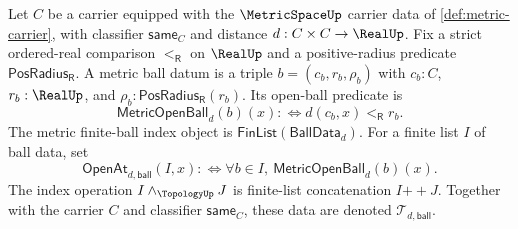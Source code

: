 \begin{definition}
\label{def:metric-finite-ball-indexed-topology}
Let $C$ be a carrier equipped with the $\MetricSpaceUp$ carrier data of \autoref{def:metric-carrier}, with classifier $\mathsf{same}_C$ and distance $d:C\times C\to\RealUp$. Fix a strict ordered-real comparison $<_{\mathsf R}$ on $\RealUp$ and a positive-radius predicate $\mathsf{PosRadius}_{\mathsf R}$. A metric ball datum is a triple $b=(c_b,r_b,\rho_b)$ with $c_b:C$, $r_b:\RealUp$, and $\rho_b:\mathsf{PosRadius}_{\mathsf R}(r_b)$. Its open-ball predicate is
$$
\mathsf{MetricOpenBall}_d(b)(x)
:\Longleftrightarrow
 d(c_b,x)<_{\mathsf R}r_b.
$$
The metric finite-ball index object is $\mathsf{FinList}(\mathsf{BallData}_d)$. For a finite list $I$ of ball data, set
$$
\mathsf{OpenAt}_{d,\mathsf{ball}}(I,x)
:\Longleftrightarrow
\forall b\in I,\ \mathsf{MetricOpenBall}_d(b)(x).
$$
The index operation $I\wedge_{\TopologyUp}J$ is finite-list concatenation $I\mathbin{+\!\!+}J$. Together with the carrier $C$ and classifier $\mathsf{same}_C$, these data are denoted $\mathcal{T}_{d,\mathsf{ball}}$.
\end{definition}

